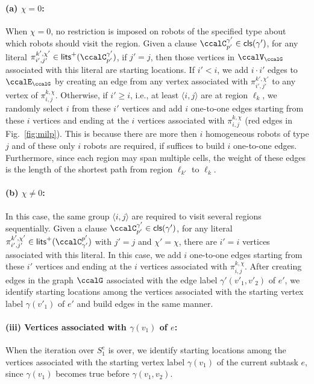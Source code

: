 \documentclass[Afour,sageh,times]{sagej}
\newcommand{\clause}[1]{\mathsf{cls}(#1)}
\newcommand{\ag}[2]{\langle#1,#2\rangle}
\renewcommand{\ap}[3]{\mathcal{\pi}_{{#1},{#2}}^{#3}}
\begin{document}
\paragraph{\quad (a) $\chi = 0$:} When $\chi=0$, no restriction is imposed on robots of the specified type about which robots should visit the region.  Given a clause $\ccalC^{\gamma'}_{p'} \in \clause{\gamma'}$, for any literal $\ap{i'}{j'}{k',\chi'} \in\mathsf{lits}^+(\ccalC^{\gamma'}_{p'})$, if $j'=j$, then those vertices in $\ccalV_\ccalG$ associated with this literal are starting locations. If $i'<i$, we add $i\cdot  i'$ edges to $\ccalE_\ccalG$ by creating an edge from any vertex associated with $\ap{i'}{j'}{k',\chi'}$ to any vertex of $\ap{i}{j}{k,\chi}$. Otherwise, if $i' \geq  i$, i.e., at least $\ag{i}{j}$ are at region $\ell_k$, we randomly select $i$ from these $i'$ vertices and add $i$ one-to-one edges starting from these $i$ vertices and ending at the $i$ vertices associated with $\ap{i}{j}{k,\chi}$ (red edges in Fig.~\ref{fig:milp}). This is because there are more then $i$ homogeneous robots of type $j$ and of these only $i$ robots are required, if suffices to build $i$ one-to-one edges. Furthermore, since each region may span multiple cells, the weight of these edges is the length of the shortest path from region  $\ell_{k'}$ to $\ell_k$. %
  \paragraph{\quad (b) $\chi \not=0$:} In this case, the same group $\ag{i}{j}$ are required to visit several regions sequentially.
  Given a clause $\ccalC^{\gamma'}_{p'} \in \clause{\gamma'}$, for any literal $\ap{i'}{j'}{k',\chi'} \in\mathsf{lits}^+(\ccalC_{\gamma'}^{p'})$ with $j'=j$ and $\chi'=\chi$, there are $i'=i$ vertices associated with this literal. In this case, we add $i$ one-to-one edges starting from these $i'$ vertices and ending at the $i$ vertices associated with $\ap{i}{j}{k,\chi}$. After creating edges in the graph $\ccalG$ associated with the edge label  $\gamma'(v'_1,v'_2)$ of $e'$, we identify  starting locations among the vertices associated with the starting vertex label $\gamma(v'_1)$ of $e'$ and build edges in the same manner.
\paragraph{(iii) Vertices associated with $\gamma(v_1)$ of $e$:}\label{sec:c} When the iteration over $S_1^e$ is over, we identify  starting locations among the vertices associated with the starting vertex label  $\gamma(v_1)$ of the current subtask $e$, since $\gamma(v_1)$  becomes true before $\gamma(v_1, v_2)$.
\end{document}
